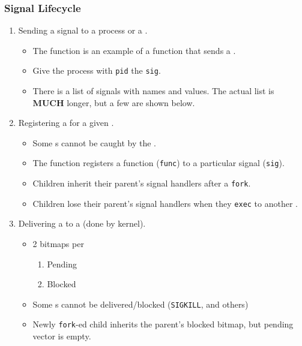 \subsubsection{Signal Lifecycle}\label{subsubsec:Signal_Lifecycle}
\begin{enumerate}[noitemsep]
\item Sending a signal to a process or a .
  \begin{itemize}[noitemsep]
  \item The  function is an example of a function that sends a .
  \item Give the process with \texttt{pid} the  \texttt{sig}.
  \item There is a list of signals with names and values.
    The actual list is \textbf{MUCH} longer, but a few are shown below.
  \end{itemize}

\item Registering a  for a given .
  \begin{itemize}[noitemsep]
  \item Some s cannot be caught by the .
  \item The function  registers a function (\texttt{func}) to a particular signal (\texttt{sig}).
  \item Children inherit their parent's signal handlers after a \texttt{fork}.
  \item Children lose their parent's signal handlers when they \texttt{exec} to another .
  \end{itemize}

\item Delivering a  to a  (done by kernel).
  \begin{itemize}[noitemsep]
  \item 2 bitmaps per 
    \begin{enumerate}[noitemsep]
    \item Pending
    \item Blocked
    \end{enumerate}
  \item Some s cannot be delivered/blocked (\texttt{SIGKILL}, and others)
  \item Newly \texttt{fork}-ed child inherits the parent's blocked bitmap, but pending vector is empty.
  \end{itemize}


\end{enumerate}
